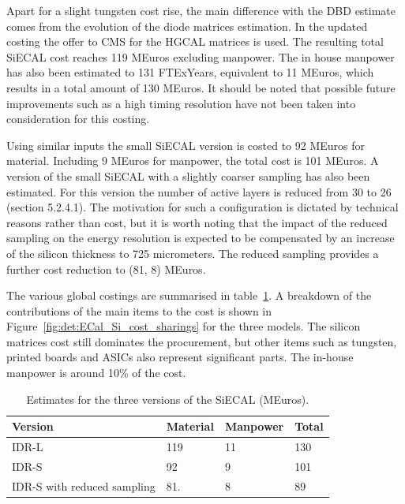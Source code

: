 Apart for a slight tungsten cost rise, the main difference with the DBD estimate comes from the evolution of the diode matrices estimation. In the updated costing the offer to CMS for the HGCAL matrices is used. The resulting total SiECAL cost reaches 119 MEuros excluding manpower. The in house manpower has also been estimated to 131 FTExYears, equivalent to 11 MEuros, which results in a total amount of 130 MEuros. It should be noted that possible future improvements such as a high timing resolution have not been taken into consideration for this costing.

Using similar inputs the small SiECAL version is costed to 92 MEuros for material. Including 9 MEuros for manpower, the total cost is 101 MEuros. 
A version of the small SiECAL with a slightly coarser sampling has also been estimated. For this version the number of active layers is reduced from 30 to 26 (section 5.2.4.1). The motivation for such a configuration is dictated by technical reasons rather than cost, but it is worth noting that the impact of the reduced sampling on the energy resolution is expected to be compensated by an increase of the silicon thickness to 725 micrometers. The reduced sampling provides a further cost reduction to (81, 8) MEuros.  

The various global costings are summarised in table~\ref{ECal_summary}. A breakdown of the contributions of the main items to the cost is shown in Figure~\ref{fig:det:ECal_Si_cost_sharings} for the three models. The silicon matrices cost still dominates the procurement, but other items such as tungsten, printed boards and ASICs also represent significant parts. The in-house manpower is around 10\% of the cost.

\begin{table}\hspace*{-0cm}\small 
\begin{tabular}[h!]{ l p{0.2\hsize}p{0.2\hsize}p{0.2\hsize} }
\toprule
Version& Material & Manpower & Total \\
\midrule
IDR-L                       & 119   & 11    & 130   \\
IDR-S                       & 92    &  9    & 101   \\
IDR-S with reduced sampling & 81.   &  8    & 89  \\
\bottomrule
\end{tabular}
\caption{\label{ECal_summary}Estimates for the three versions of the SiECAL (MEuros).}
\end{table}

